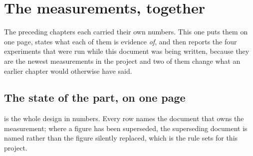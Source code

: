 
\chapter{The measurements, together}
\label{ch:results}

The preceding chapters each carried their own numbers. This one puts
them on one page, states what each of them is evidence \emph{of}, and
then reports the four experiments that were run while this document was
being written, because they are the newest measurements in the project
and two of them change what an earlier chapter would otherwise have
said.

\section{The state of the part, on one page}

 is the whole design in numbers. Every row names the
document that owns the measurement; where a figure has been superseded,
the superseding document is named rather than the figure silently
replaced, which is the rule  sets for this project.

